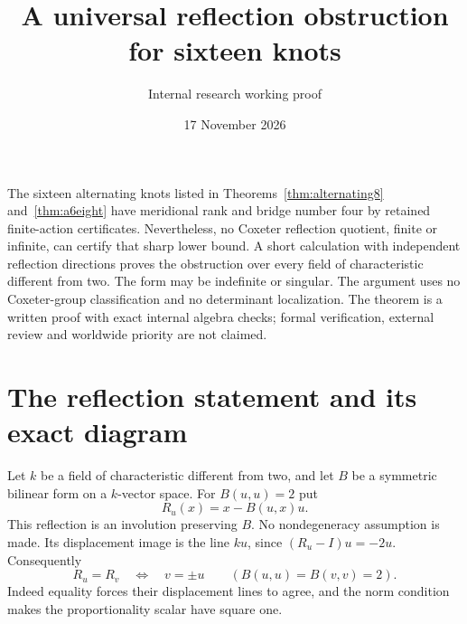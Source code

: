 \documentclass[11pt]{article}
\title{A universal reflection obstruction for sixteen knots}
\author{Internal research working proof}
\date{17 November 2026}
\begin{document}
\maketitle

The sixteen alternating knots listed in Theorems~\ref{thm:alternating8}
and~\ref{thm:a6eight} have meridional rank and bridge number four by
retained finite-action certificates. Nevertheless, no Coxeter
reflection quotient, finite or infinite, can certify that sharp lower
bound. A short calculation with independent reflection directions
proves the obstruction over every field of characteristic different
from two. The form may be indefinite or singular. The argument uses
no Coxeter-group classification and no determinant localization.
The theorem is a written proof with exact internal algebra checks;
formal verification, external review and worldwide priority are not
claimed.

\section{The reflection statement and its exact diagram}

Let $k$ be a field of characteristic different from two, and let $B$
be a symmetric bilinear form on a $k$-vector space. For $B(u,u)=2$ put
\[
                         R_u(x)=x-B(u,x)u.
\]
This reflection is an involution preserving $B$. No nondegeneracy
assumption is made. Its displacement image is the line $ku$, since
$(R_u-I)u=-2u$. Consequently
\begin{equation}\label{eq:sign}
                   R_u=R_v\quad\Longleftrightarrow\quad v=\pm u
                   \qquad(B(u,u)=B(v,v)=2).
\end{equation}
Indeed equality forces their displacement lines to agree, and the
norm condition makes the proportionality scalar have square one.
\end{document}
